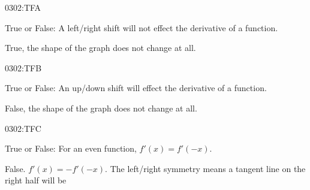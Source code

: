 \begin{defproblem}{0302:TFA}
\begin{onlyproblem}
\begin{exercise}
True or False: A left/right shift will not effect the derivative of a function.
\end{exercise}
\end{onlyproblem}
\begin{onlysolution}
True, the shape of the graph does not change at all.
\end{onlysolution}
\end{defproblem}

\begin{defproblem}{0302:TFB}
\begin{onlyproblem}
\begin{exercise}
True or False: An up/down shift will effect the derivative of a function.
\end{exercise}
\end{onlyproblem}
\begin{onlysolution}
False, the shape of the graph does not change at all.
\end{onlysolution}
\end{defproblem}

\begin{defproblem}{0302:TFC}
\begin{onlyproblem}
\begin{exercise}
True or False: For an even function, $f'(x)=f'(-x)$.
\end{exercise}
\end{onlyproblem}
\begin{onlysolution}
False.  $f'(x)=-f'(-x)$. The left/right symmetry means a tangent line on the
right half will be 
\end{onlysolution}
\end{defproblem}
\endinput
